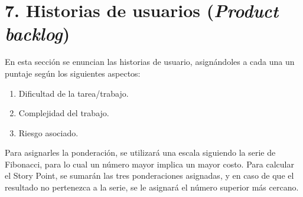 \documentclass[
11pt, %
codirector, %
]{charter}
\begin{document}
\begin{enumerate}
\begin{enumerate}
            
         \end{enumerate}

    
	
\end{enumerate}

\section{7. Historias de usuarios (\textit{Product backlog})}
\label{sec:backlog}

En esta sección se enuncian las historias de usuario, asignándoles a cada una un puntaje según los siguientes aspectos:
    \begin{enumerate}
        \item Dificultad de la tarea/trabajo.
        \item Complejidad del trabajo.
        \item Riesgo asociado.
    \end{enumerate}

Para asignarles la ponderación, se utilizará una escala siguiendo la serie de Fibonacci, para lo cual un número mayor implica un mayor costo. Para calcular el Story Point, se sumarán las tres ponderaciones asignadas, y en caso de que el resultado no pertenezca a la serie, se le asignará el número superior más cercano.
\end{document}

